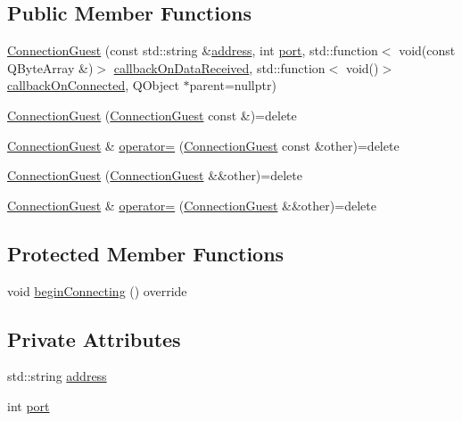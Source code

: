 \subsection*{Public Member Functions}
\begin{DoxyCompactItemize}
\item 
\hyperlink{classMODEL_1_1ConnectionGuest_ab8d5bc0edf4d5533d3c9340d901e8677}{Connection\+Guest} (const std\+::string \&\hyperlink{classMODEL_1_1ConnectionGuest_a8b6f74419f28d6b9d96568f2f1087c3e}{address}, int \hyperlink{classMODEL_1_1ConnectionGuest_a63c89c04d1feae07ca35558055155ffb}{port}, std\+::function$<$ void(const Q\+Byte\+Array \&)$>$ \hyperlink{classMODEL_1_1Connection_aa0b44072225e1b07b646bd973719ac80}{callback\+On\+Data\+Received}, std\+::function$<$ void()$>$ \hyperlink{classMODEL_1_1Connection_a0cb35149e127dbce2a09f0ac5d5cfc16}{callback\+On\+Connected}, Q\+Object $\ast$parent=nullptr)
\item 
\hyperlink{classMODEL_1_1ConnectionGuest_ae5f32ba2fd933170b2652b1b35441e8b}{Connection\+Guest} (\hyperlink{classMODEL_1_1ConnectionGuest}{Connection\+Guest} const \&)=delete
\item 
\hyperlink{classMODEL_1_1ConnectionGuest}{Connection\+Guest} \& \hyperlink{classMODEL_1_1ConnectionGuest_ae55994c212e438a0345319dc2de4fb3a}{operator=} (\hyperlink{classMODEL_1_1ConnectionGuest}{Connection\+Guest} const \&other)=delete
\item 
\hyperlink{classMODEL_1_1ConnectionGuest_a396b57f90e3db3e21334e007590d6991}{Connection\+Guest} (\hyperlink{classMODEL_1_1ConnectionGuest}{Connection\+Guest} \&\&other)=delete
\item 
\hyperlink{classMODEL_1_1ConnectionGuest}{Connection\+Guest} \& \hyperlink{classMODEL_1_1ConnectionGuest_a66b6e88685e8545357fe457d087c0c38}{operator=} (\hyperlink{classMODEL_1_1ConnectionGuest}{Connection\+Guest} \&\&other)=delete
\end{DoxyCompactItemize}
\subsection*{Protected Member Functions}
\begin{DoxyCompactItemize}
\item 
void \hyperlink{classMODEL_1_1ConnectionGuest_ac867d4f9a602bf9d11bf2c653cbf4fe4}{begin\+Connecting} () override
\end{DoxyCompactItemize}
\subsection*{Private Attributes}
\begin{DoxyCompactItemize}
\item 
std\+::string \hyperlink{classMODEL_1_1ConnectionGuest_a8b6f74419f28d6b9d96568f2f1087c3e}{address}
\item 
int \hyperlink{classMODEL_1_1ConnectionGuest_a63c89c04d1feae07ca35558055155ffb}{port}
\end{DoxyCompactItemize}
